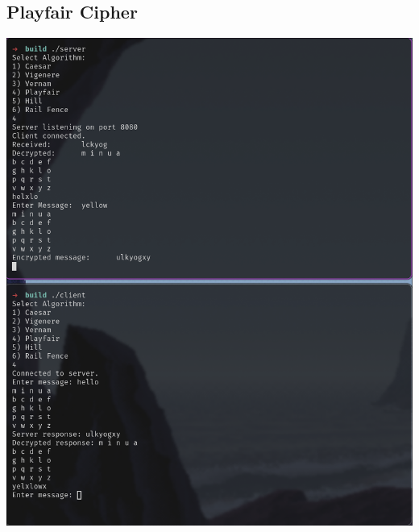 \documentclass[titlepage]{article}
\begin{document}
\subsection{Playfair Cipher}
\includegraphics[scale=0.4]{playfair.png}
\end{document}
